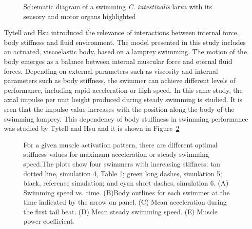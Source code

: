 \begin{figure}[H]
\centering
  \begin{footnotesize}
  
  \caption[Schematic diagram of a swimming \textit{C. intestinalis} larva with its sensory and motor organs highlighted]{Schematic diagram of a swimming \textit{C. intestinalis} larva with its sensory and motor organs highlighted}
  \label{fig:Bild3.7}
  \end{footnotesize}
\end{figure} 



Tytell and Hsu \cite{tytell_interactions_2010} introduced the relevance of interactions between internal force, body stiffness and fluid environment. The model presented in this
study includes an actuated, viscoelastic body, based on a lamprey swimming. The motion of the body emerges as a balance between internal muscular force and eternal fluid
forces. Depending on external parameters such as viscosity and internal parameters such as body stiffness, the swimmer can achieve different levels of performance, including
rapid acceleration or high speed. In this same study, the axial impulse per unit height produced during steady swimming is studied. It is seen that the impulse value increases with the position
along the body of the swimming lamprey. This dependency of body stuffiness in swimming performance was studied by Tytell and Hsu and it is shown in Figure~\ref{fig:Bild3.8}
\par


\begin{figure}[H]
\centering
  \begin{footnotesize}
  
  \caption[For a given muscle activation pattern, there are different optimal stiffness values for maximum acceleration or steady swimming speed.The plots show four swimmers 
  with increasing stiffness: tan dotted line, simulation 4, Table 1; green long dashes, simulation 5; black, reference simulation; and cyan short dashes, simulation 6. (A)
  Swimming speed vs. time. (B)Body outlines for each swimmer at the time indicated by the arrow on panel. (C) Mean acceleration during the first tail beat. (D) Mean steady
  swimming speed. (E) Muscle power coefficient]{For a given muscle activation pattern, there are different optimal stiffness values for maximum acceleration or steady swimming speed.The plots show four swimmers 
  with increasing stiffness: tan dotted line, simulation 4, Table 1; green long dashes, simulation 5; black, reference simulation; and cyan short dashes, simulation 6. (A)
  Swimming speed vs. time. (B)Body outlines for each swimmer at the time indicated by the arrow on panel. (C) Mean acceleration during the first tail beat. (D) Mean steady
  swimming speed. (E) Muscle power coefficient. \cite{tytell_interactions_2010}}
  \label{fig:Bild3.8}
  \end{footnotesize}
\end{figure} 






